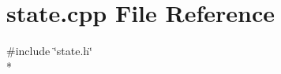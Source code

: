 \section{state.\-cpp File Reference}
\label{state_8cpp}
{\ttfamily \#include \char`\"{}state.\-h\char`\"{}}\\*
